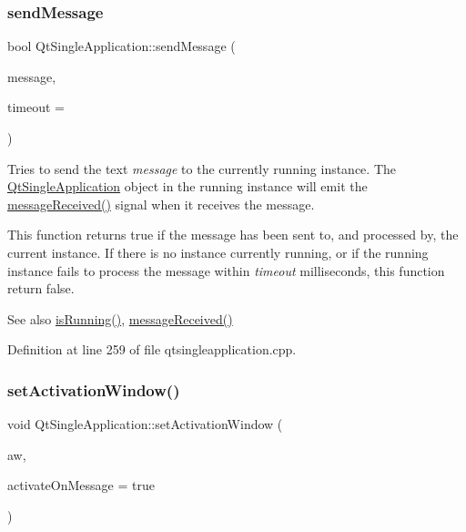 \subsubsection{\texorpdfstring{send\+Message}{sendMessage}}
{\footnotesize\ttfamily bool Qt\+Single\+Application\+::send\+Message (\begin{DoxyParamCaption}\item[{const Q\+String \&}]{message,  }\item[{int}]{timeout = {} }\end{DoxyParamCaption})\hspace{0.3cm}{\ttfamily [slot]}}

Tries to send the text {\itshape message} to the currently running instance. The \hyperlink{class_qt_single_application}{Qt\+Single\+Application} object in the running instance will emit the \hyperlink{class_qt_single_application_a69340cef3d26d026e11424930e5a5866}{message\+Received()} signal when it receives the message.

This function returns true if the message has been sent to, and processed by, the current instance. If there is no instance currently running, or if the running instance fails to process the message within {\itshape timeout} milliseconds, this function return false.

\begin{DoxySeeAlso}{See also}
\hyperlink{class_qt_single_application_aa9f0e6e4f18ac79bbb7a955cd860894d}{is\+Running()}, \hyperlink{class_qt_single_application_a69340cef3d26d026e11424930e5a5866}{message\+Received()} 
\end{DoxySeeAlso}


Definition at line 259 of file qtsingleapplication.\+cpp.

\mbox{\label{class_qt_single_application_acb5347f6dc6822dbe4d6a78804043528}} 
\subsubsection{\texorpdfstring{set\+Activation\+Window()}{setActivationWindow()}}
{\footnotesize\ttfamily void Qt\+Single\+Application\+::set\+Activation\+Window (\begin{DoxyParamCaption}\item[{Q\+Widget $\ast$}]{aw,  }\item[{bool}]{activate\+On\+Message = {\ttfamily true} }\end{DoxyParamCaption})}

